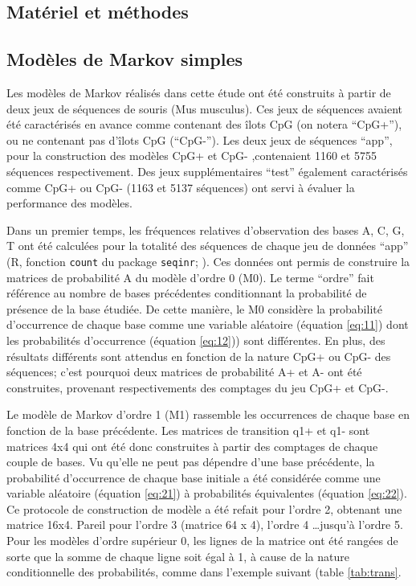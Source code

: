 \documentclass[10pt,a4paper,notitlepage,colorinlistoftodos]{article}
\begin{document}
\begin{multicols}{2}
\section*{Matériel et méthodes}

\subsection{Modèles de Markov simples}

Les modèles de Markov réalisés dans cette étude ont été construits à partir de deux jeux de séquences de  souris (Mus musculus). Ces jeux de séquences avaient été caractérisés en avance comme contenant des îlots CpG (on notera “CpG+”), ou ne contenant pas d’îlots CpG (“CpG-”). Les deux jeux de séquences “app”, pour la construction des modèles CpG+ et CpG- ,contenaient 1160 et 5755 séquences respectivement. Des jeux supplémentaires “test” également caractérisés comme CpG+ ou CpG- (1163 et 5137 séquences) ont servi à évaluer la performance des modèles. 
 
Dans un premier temps, les fréquences relatives d’observation des bases A, C, G, T ont été calculées pour la totalité des séquences de chaque jeu de données “app” (R,  fonction \verb|count| du package \verb|seqinr|; \cite{Charif2007}).  Ces données ont permis de construire la matrices de probabilité A du modèle d’ordre 0 (M0). Le terme “ordre” fait référence au nombre de bases précédentes conditionnant la probabilité de présence de la base étudiée. De cette manière, le M0 considère la probabilité d’occurrence de chaque base comme une variable aléatoire (équation \ref{eq:11}) dont les probabilités d’occurrence (équation \ref{eq:12})) sont différentes. En plus, des résultats différents sont attendus en fonction de la nature CpG+ ou CpG- des séquences; c’est pourquoi deux matrices de probabilité A+ et A- ont été construites, provenant respectivements des comptages du jeu CpG+ et CpG-.

Le modèle de Markov d’ordre 1 (M1) rassemble les occurrences de chaque base en fonction de la base précédente. Les matrices de transition q1+ et q1- sont matrices 4x4 qui ont été donc construites à partir des comptages de chaque couple de bases. Vu qu’elle ne peut pas dépendre d’une base précédente, la probabilité d’occurrence de chaque base initiale a été considérée comme une variable aléatoire (équation \ref{eq:21}) à probabilités équivalentes (équation \ref{eq:22}). Ce protocole de construction de modèle a été refait pour l’ordre 2, obtenant une matrice 16x4. Pareil pour l’ordre  3 (matrice 64 x 4), l’ordre 4 \dots jusqu’à l’ordre 5. Pour les modèles d’ordre supérieur 0, les lignes de la matrice ont été rangées de sorte que la somme de chaque ligne soit égal à 1, à cause de la nature conditionnelle des probabilités, comme dans l'exemple suivant (table \ref{tab:trans}. 


\end{multicols}
\end{document}
